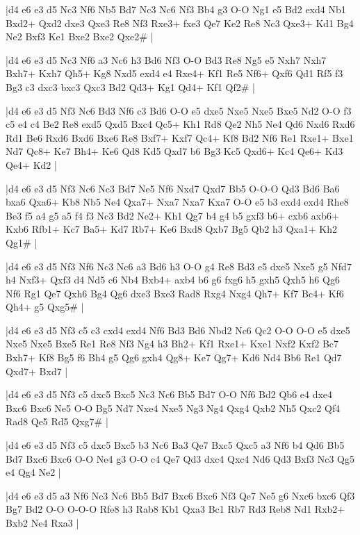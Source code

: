 \whitename{}
\blackname{}
\makegametitle
|d4 e6 e3 d5 Nc3 Nf6 Nb5 Bd7 Nc3 Nc6 Nf3 Bb4 g3 O-O Ng1 e5 Bd2 exd4 Nb1 Bxd2+ Qxd2 dxe3 Qxe3 Re8 Nf3 Rxe3+ fxe3 Qe7 Ke2 Re8 Nc3 Qxe3+ Kd1 Bg4 Ne2 Bxf3 Ke1 Bxe2 Bxe2 Qxe2\#  |

\whitename{}
\blackname{}
\makegametitle
|d4 e6 e3 d5 Nc3 Nf6 a3 Nc6 h3 Bd6 Nf3 O-O Bd3 Re8 Ng5 e5 Nxh7 Nxh7 Bxh7+ Kxh7 Qh5+ Kg8 Nxd5 exd4 e4 Rxe4+ Kf1 Re5 Nf6+ Qxf6 Qd1 Rf5 f3 Bg3 c3 dxc3 bxc3 Qxc3 Bd2 Qd3+ Kg1 Qd4+ Kf1 Qf2\#  |

\whitename{}
\blackname{}
\makegametitle
|d4 e6 e3 d5 Nf3 Nc6 Bd3 Nf6 c3 Bd6 O-O e5 dxe5 Nxe5 Nxe5 Bxe5 Nd2 O-O f3 c5 e4 c4 Be2 Re8 exd5 Qxd5 Bxc4 Qc5+ Kh1 Rd8 Qe2 Nh5 Ne4 Qd6 Nxd6 Rxd6 Rd1 Be6 Rxd6 Bxd6 Bxe6 Re8 Bxf7+ Kxf7 Qc4+ Kf8 Bd2 Nf6 Re1 Rxe1+ Bxe1 Nd7 Qc8+ Ke7 Bh4+ Ke6 Qd8 Kd5 Qxd7 b6 Bg3 Kc5 Qxd6+ Kc4 Qe6+ Kd3 Qe4+ Kd2  |

\whitename{}
\blackname{}
\makegametitle
|d4 e6 e3 d5 Nf3 Nc6 Nc3 Bd7 Ne5 Nf6 Nxd7 Qxd7 Bb5 O-O-O Qd3 Bd6 Ba6 bxa6 Qxa6+ Kb8 Nb5 Ne4 Qxa7+ Nxa7 Nxa7 Kxa7 O-O e5 b3 exd4 exd4 Rhe8 Be3 f5 a4 g5 a5 f4 f3 Nc3 Bd2 Ne2+ Kh1 Qg7 b4 g4 b5 gxf3 b6+ cxb6 axb6+ Kxb6 Rfb1+ Kc7 Ba5+ Kd7 Rb7+ Ke6 Bxd8 Qxb7 Bg5 Qb2 h3 Qxa1+ Kh2 Qg1\#  |

\whitename{}
\blackname{}
\makegametitle
|d4 e6 e3 d5 Nf3 Nf6 Nc3 Nc6 a3 Bd6 h3 O-O g4 Re8 Bd3 e5 dxe5 Nxe5 g5 Nfd7 h4 Nxf3+ Qxf3 d4 Nd5 c6 Nb4 Bxb4+ axb4 b6 g6 fxg6 h5 gxh5 Qxh5 h6 Qg6 Nf6 Rg1 Qe7 Qxh6 Bg4 Qg6 dxe3 Bxe3 Rad8 Rxg4 Nxg4 Qh7+ Kf7 Bc4+ Kf6 Qh4+ g5 Qxg5\#  |

\whitename{}
\blackname{}
\makegametitle
|d4 e6 e3 d5 Nf3 c5 c3 cxd4 exd4 Nf6 Bd3 Bd6 Nbd2 Nc6 Qc2 O-O O-O e5 dxe5 Nxe5 Nxe5 Bxe5 Re1 Re8 Nf3 Ng4 h3 Bh2+ Kf1 Rxe1+ Kxe1 Nxf2 Kxf2 Bc7 Bxh7+ Kf8 Bg5 f6 Bh4 g5 Qg6 gxh4 Qg8+ Ke7 Qg7+ Kd6 Nd4 Bb6 Re1 Qd7 Qxd7+ Bxd7  |

\whitename{}
\blackname{}
\makegametitle
|d4 e6 e3 d5 Nf3 c5 dxc5 Bxc5 Nc3 Nc6 Bb5 Bd7 O-O Nf6 Bd2 Qb6 e4 dxe4 Bxc6 Bxc6 Ne5 O-O Bg5 Nd7 Nxe4 Nxe5 Ng3 Ng4 Qxg4 Qxb2 Nh5 Qxc2 Qf4 Rad8 Qe5 Rd5 Qxg7\#  |

\whitename{}
\blackname{}
\makegametitle
|d4 e6 e3 d5 Nf3 c5 dxc5 Bxc5 b3 Nc6 Ba3 Qe7 Bxc5 Qxc5 a3 Nf6 b4 Qd6 Bb5 Bd7 Bxc6 Bxc6 O-O Ne4 g3 O-O c4 Qe7 Qd3 dxc4 Qxc4 Nd6 Qd3 Bxf3 Nc3 Qg5 e4 Qg4 Ne2  |

\whitename{}
\blackname{}
\makegametitle
|d4 e6 e3 d5 a3 Nf6 Nc3 Nc6 Bb5 Bd7 Bxc6 Bxc6 Nf3 Qe7 Ne5 g6 Nxc6 bxc6 Qf3 Bg7 Bd2 O-O O-O-O Rfe8 h3 Rab8 Kb1 Qxa3 Bc1 Rb7 Rd3 Reb8 Nd1 Rxb2+ Bxb2 Ne4 Rxa3  |

